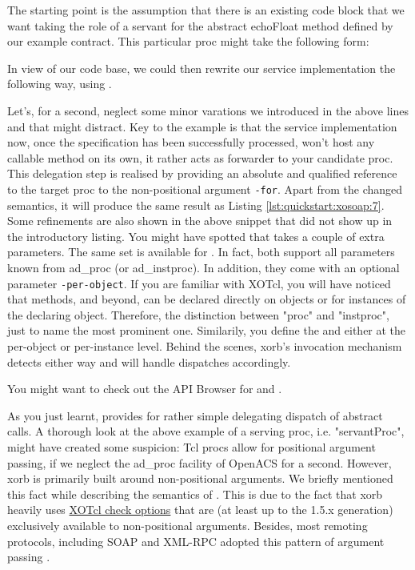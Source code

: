 The starting point is the assumption that there is an existing code block that we want taking the role of a servant for the abstract echoFloat method defined by our example contract. This particular proc might take the following form:
\lstset{breaklines=true,numbers=left,basicstyle=\footnotesize,frame=single}

 
In view of our code base, we could then rewrite our service implementation the following way, using .



Let's, for a second, neglect some minor varations we introduced in the above lines and that might distract. Key to the example is that the service implementation now, once the specification has been successfully processed, won't host any callable method on its own, it rather acts as forwarder to your candidate proc. This delegation step is realised by providing an absolute and qualified reference to the target proc to the non-positional argument \lstinline!-for!. Apart from the changed semantics, it will produce the same result as Listing \ref{lst:quickstart:xosoap:7}. Some refinements are also shown in the above snippet that did not show up in the introductory listing.
You might have spotted that  takes a couple of extra parameters. The same set is available for . In fact, both support all parameters known from ad\_proc (or ad\_instproc). In addition, they come with an optional parameter \lstinline!-per-object!. If you are familiar with XOTcl, you will have noticed that methods, and beyond, can be declared directly on objects or for instances of the declaring object. Therefore, the distinction between "proc" and "instproc", just to name the most prominent one. Similarily, you define the  and  either at the per-object or per-instance level. Behind the scenes, xorb's invocation mechanism detects either way and will handle dispatches accordingly.
\begin{hints}
\item You might want to check out the API Browser for  and .
\end{hints}
As you just learnt,  provides for rather simple delegating dispatch of abstract calls. A thorough look at the above example of a serving proc, i.e. "servantProc", might have created some suspicion: Tcl procs allow for positional argument passing, if we neglect the ad\_proc facility of OpenACS for a second. However, xorb is primarily built around non-positional arguments. We briefly mentioned this fact while describing the semantics of . This is due to the fact that xorb heavily uses \href{http://media.wu-wien.ac.at/doc/tutorial.html#non-pos-args}{XOTcl check options} that are (at least up to the 1.5.x generation) exclusively available to non-positional arguments. Besides, most remoting protocols, including SOAP and XML-RPC adopted this pattern of argument passing \cite{zdun:2005b}. 

